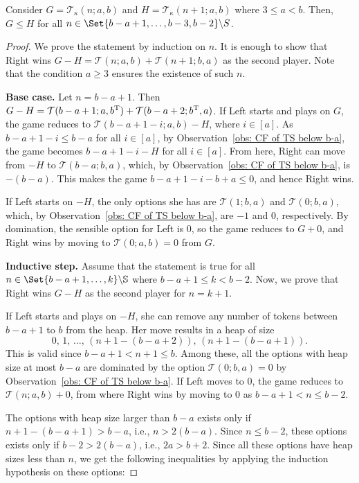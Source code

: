 \documentclass[oneside,reqno]{amsart}
\newcommand{\ts}{\mathcal{T}}
\begin{document}
\begin{proposition}\label{prop: domination at b-a}
Consider $G=\ts_{\kappa}(n;a,b)$ and $H=\ts_{\kappa}(n+1;a,b)$ where $3\le a<b$. Then, $G\le H$ for all $n\in \Set{b-a+1,\dots,b-3,b-2}\backslash S$.
\end{proposition}
\begin{proof}
    We prove the statement by induction on $n$. It is enough to show that Right wins $G-H=\ts(n;a,b)+\ts(n+1;b,a)$ as the second player. Note that the condition $a\ge 3$ ensures the existence of such $n$.

    \textbf{Base case.} Let $n=b-a+1$. Then $G-H=\ts(b-a+1;a,b^{\rm T})+\ts(b-a+2;b^{\rm T},a)$. If Left starts and plays on $G$, the game reduces to $\ts(b-a+1-i;a,b)-H$, where $i\in[a]$. As $b-a+1-i\leq b-a$ for all $i\in[a]$, by Observation~\ref{obs: CF of TS below b-a}, the game becomes $b-a+1-i-H$ for all $i\in[a]$. From here, Right can move from $-H$ to $\ts(b-a;b,a)$, which, by Observation~\ref{obs: CF of TS below b-a}, is $-(b-a)$. This makes the game $b-a+1-i-b+a\le 0$, and hence Right wins. 
    
    If Left starts on $-H$, the only options she has are $\ts(1;b,a)$ and $\ts(0;b,a)$, which, by Observation~\ref{obs: CF of TS below b-a}, are $-1$ and 0, respectively. By domination, the sensible option for Left is 0, so the game reduces to $G+0$, and Right wins by moving to $\ts(0;a,b)=0$ from $G$.

    \textbf{Inductive step.} Assume that the statement is true for all $n\in \Set{b-a+1,\dots,k}\backslash\mathbb S$ where $b-a+1\le k<b-2$. Now, we prove that Right wins $G-H$ as the second player for $n=k+1$. 
    
    If Left starts and plays on $-H$, she can remove any number of tokens between $b-a+1$ to $b$ from the heap. Her move results in a heap of size
    $$0,\,1,\,\dots,\,(n+1-(b-a+2)),\,(n+1-(b-a+1)).$$ This is valid since $b-a+1<n+1\le b$. Among these, all the options with heap size at most $b-a$ are dominated by the option $\ts(0;b,a)=0$ by Observation~\ref{obs: CF of TS below b-a}. If Left moves to 0, the game reduces to $\ts(n;a,b)+0$, from where Right wins by moving to 0 as $b-a+1< n\le b-2$.
    
    The options with heap size larger than $b-a$ exists only if $n+1-(b-a+1)>b-a$, i.e., $n>2(b-a)$. Since $n\le b-2$, these options exists only if $b-2>2(b-a)$, i.e., $2a>b+2$. Since all these options have heap sizes less than $n$, we get the following inequalities by applying the induction hypothesis on these options:


\end{proof}
\end{document}
